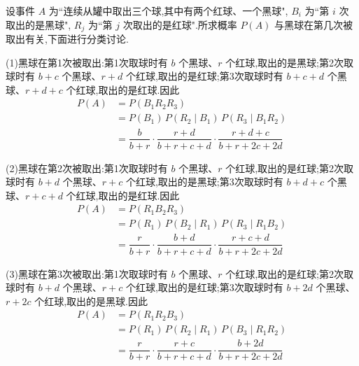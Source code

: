 \begin{solution}
    {\linespread{1.18}\selectfont
    设事件 $A$ 为``连续从罐中取出三个球,其中有两个红球、一个黑球", $B_i$ 为``第 $i$ 次取出的是黑球", $R_j$ 为``第 $j$ 次取出的是红球".所求概率 $P(A)$ 与黑球在第几次被取出有关,下面进行分类讨论.

    (1)黑球在第1次被取出:第1次取球时有 $b$ 个黑球、$r$ 个红球,取出的是黑球;第2次取球时有 $b+c$ 个黑球、$r+d$ 个红球,取出的是红球;第3次取球时有 $b+c+d$ 个黑球、$r+d+c$ 个红球,取出的是红球.因此
    $$
    \begin{aligned}
        P(A) &= P(B_1 R_2 R_3) \\
        &= P(B_1) \, P(R_2 \mid B_1) \, P(R_3 \mid B_1 R_2) \\
        &= \dfrac{b}{b+r} \cdot \dfrac{r+d}{b+r+c+d} \cdot \dfrac{r+d+c}{b+r+2c+2d}
    \end{aligned}
    $$

    (2)黑球在第2次被取出:第1次取球时有 $b$ 个黑球、$r$ 个红球,取出的是红球;第2次取球时有 $b+d$ 个黑球、$r+c$ 个红球,取出的是黑球;第3次取球时有 $b+d+c$ 个黑球、$r+c+d$ 个红球,取出的是红球.因此
    $$
    \begin{aligned}
        P(A) &= P(R_1 B_2 R_3) \\
        &= P(R_1) \, P(B_2 \mid R_1) \, P(R_3 \mid R_1 B_2) \\
        &= \dfrac{r}{b+r} \cdot \dfrac{b+d}{b+r+c+d} \cdot \dfrac{r+c+d}{b+r+2c+2d}
    \end{aligned}
    $$

    (3)黑球在第3次被取出:第1次取球时有 $b$ 个黑球、$r$ 个红球,取出的是红球;第2次取球时有 $b+d$ 个黑球、$r+c$ 个红球,取出的是红球;第3次取球时有 $b+2d$ 个黑球、$r+2c$ 个红球,取出的是黑球.因此
    $$
    \begin{aligned}
        P(A) &= P(R_1 R_2 B_3) \\
        &= P(R_1) \, P(R_2 \mid R_1) \, P(B_3 \mid R_1 R_2) \\
        &= \dfrac{r}{b+r} \cdot \dfrac{r+c}{b+r+c+d} \cdot \dfrac{b+2d}{b+r+2c+2d}
    \end{aligned}
    $$}
\end{solution}

